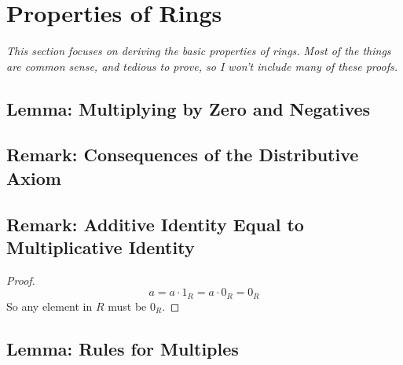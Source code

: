 \documentclass{exam}
\begin{document}
\section{Properties of Rings}

\textit{This section focuses on deriving the basic properties of rings. Most of the things are common sense, and tedious to prove, so I won't include many of these proofs.}

\subsection{Lemma: Multiplying by Zero and Negatives}


\subsection{Remark: Consequences of the Distributive Axiom}


\subsection{Remark: Additive Identity Equal to Multiplicative Identity}


\begin{proof}
\[
a = a \cdot 1_R = a \cdot 0_R = 0_R
\]
So any element in $R$ must be $0_R$.
\end{proof}

\subsection{Lemma: Rules for Multiples}
\end{document}

